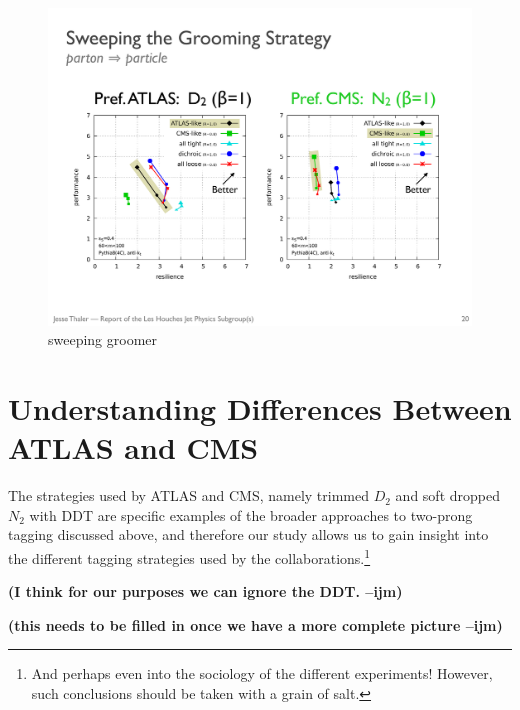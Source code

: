 \documentclass[11pt,letterpaper]{article}
\newcommand{\ijm}[1]{\textbf{\textcolor{llblue}{(#1 --ijm)}}}
\begin{document}
\begin{figure}
\begin{center}
\includegraphics[width=0.75\columnwidth]{figures/sweep_groom}
\end{center}
\caption{sweeping groomer}
\label{fig:nolabel}
\end{figure}






\section{Understanding Differences Between ATLAS and CMS}\label{sec:exp_compare}

The strategies used by ATLAS and CMS, namely trimmed $D_2$ \cite{Larkoski:2015kga,Larkoski:2014gra} and soft dropped $N_2$ \cite{Moult:2016cvt} with DDT \cite{Dolen:2016kst} are specific examples of the broader approaches to two-prong tagging discussed above, and therefore our study allows us to gain insight into the different tagging strategies used by the collaborations.\footnote{And perhaps even into the sociology of the different experiments! However, such conclusions should be taken with a grain of salt.}

\ijm{I think for our purposes we can ignore the DDT. }

\ijm{this needs to be filled in once we have a more complete picture}
\end{document}
